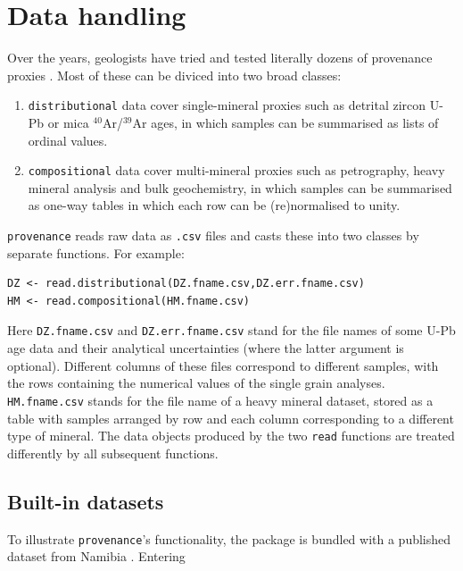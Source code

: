 \documentclass{article}
\begin{document}
\section{Data handling}
\label{sec:datahandling}

Over the years, geologists have tried and tested literally dozens of
provenance proxies \citep[e.g.,][]{basu1989, matter1985, morton1985,
  owen1987, renne1990, hurford1991, mclennan1993, vermeesch2015}. Most
of these can be diviced into two broad classes:

\begin{enumerate}
\item {\tt distributional} data cover single-mineral proxies such as
  detrital zircon U-Pb or mica $^{40}$Ar/$^{39}$Ar ages, in which
  samples can be summarised as lists of ordinal values.
\item {\tt compositional} data cover multi-mineral proxies such as
  petrography, heavy mineral analysis and bulk geochemistry, in which
  samples can be summarised as one-way tables in which each row can be
  (re)normalised to unity.
\end{enumerate}

{\tt provenance} reads raw data as {\tt .csv} files and casts these
into two classes by separate functions. For example:

\begin{verbatim}
DZ <- read.distributional(DZ.fname.csv,DZ.err.fname.csv)
HM <- read.compositional(HM.fname.csv)
\end{verbatim}

Here {\tt DZ.fname.csv} and {\tt DZ.err.fname.csv} stand for the
file names of some U-Pb age data and their analytical uncertainties
(where the latter argument is optional).  Different columns of these
files correspond to different samples, with the rows containing the
numerical values of the single grain analyses.  {\tt HM.fname.csv}
stands for the file name of a heavy mineral dataset, stored as a table
with samples arranged by row and each column corresponding to a
different type of mineral.  The data objects produced by the two
{\tt read} functions are treated differently by all subsequent
functions.

\subsection{Built-in datasets}
\label{sec:datasets}

To illustrate {\tt provenance}'s functionality, the package is bundled
with a published dataset from Namibia \citep{vermeesch2015}. Entering
\end{document}
